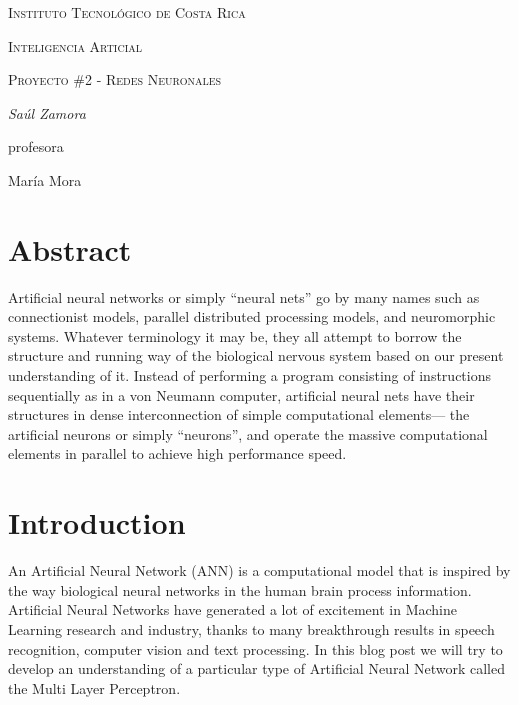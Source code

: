 \documentclass{article}
\begin{document}
\begin{titlepage}
  \centering
  {\scshape\LARGE Instituto Tecnol\'ogico de Costa Rica \par}
  \vspace{1cm}
  {\scshape\Large Inteligencia Articial\par}
  {\scshape\Large Proyecto \#2 - Redes Neuronales\par}
  \vspace{1.5cm}
  {\Large\itshape Sa\'ul Zamora\par}
  \vfill
  profesora\par
  Mar\'ia Mora \textsc{}

  \vfill

\end{titlepage}

\section{Abstract}

Artificial neural networks or simply “neural nets” go by many names such as connectionist models, parallel distributed processing models, and neuromorphic systems. Whatever terminology it may be, they all attempt to borrow the structure and running way of the biological nervous system based on our present understanding of it. Instead of performing a program consisting of instructions sequentially as in a von Neumann computer, artificial neural nets have their structures in dense interconnection of simple computational elements— the artificial neurons or simply “neurons”, and operate the massive computational elements in parallel to achieve high performance speed.

\section{Introduction}

An Artificial Neural Network (ANN) is a computational model that is inspired by the way biological neural networks in the human brain process information. Artificial Neural Networks have generated a lot of excitement in Machine Learning research and industry, thanks to many breakthrough results in speech recognition, computer vision and text processing. In this blog post we will try to develop an understanding of a particular type of Artificial Neural Network called the Multi Layer Perceptron.
\end{document}
